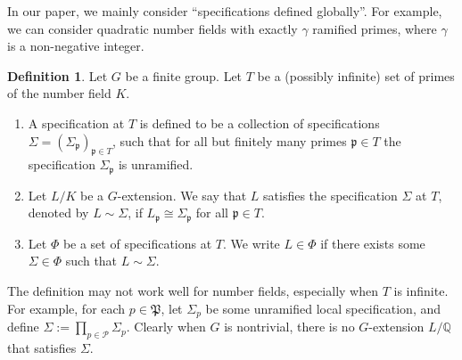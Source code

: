 \documentclass{amsart}
\numberwithin{equation}{section}
\theoremstyle{plain}
\theoremstyle{definition}
\newtheorem{definition}[theorem]{Definition}
\theoremstyle{remark}
\begin{document}
In our paper, we mainly consider ``specifications defined globally''.
For example, we can consider quadratic number fields with exactly $\gamma$ ramified primes, where $\gamma$ is a non-negative integer.
\begin{definition}\label{def: specification}
	Let $G$ be a finite group.
	Let $T$ be a (possibly infinite) set of primes of the number field $K$.
	\begin{enumerate}
		\item A specification at $T$ is defined to be a collection of specifications $\Sigma=(\Sigma_{\mathfrak{p}})_{\mathfrak{p}\in T}$, such that for all but finitely many primes $\mathfrak{p}\in T$ the specification $\Sigma_{\mathfrak{p}}$ is unramified.
		\item Let $L/K$ be a $G$-extension.
		We say that $L$ satisfies the specification $\Sigma$ at $T$, denoted by $L\sim\Sigma$, 
		if $L_{\mathfrak{p}}\cong\Sigma_{\mathfrak{p}}$ for all $\mathfrak{p}\in T$.	
		\item Let $\Phi$ be a set of specifications at $T$.
		We write $L\in\Phi$ if there exists some $\Sigma\in\Phi$ such that $L\sim\Sigma$.
	\end{enumerate}	
\end{definition}
The definition may not work well for number fields, especially when $T$ is infinite.
For example, for each $p\in\mathfrak{P}$, let $\Sigma_p$ be some unramified local specification, and define $\Sigma:=\prod_{p\in\mathcal{P}}\Sigma_p$.
Clearly when $G$ is nontrivial, there is no $G$-extension $L/\mathbb{Q}$ that satisfies $\Sigma$.
\end{document}
